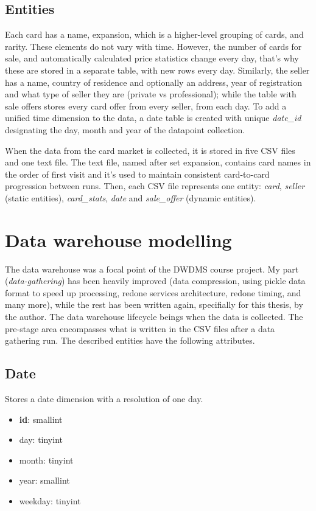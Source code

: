 \subsection{Entities}
Each card has a name, expansion, which is a higher-level grouping of cards, and rarity. These elements do not vary with time. However, the number of cards for sale, and automatically calculated price statistics change every day, that's why these are stored in a separate table, with new rows every day. Similarly, the seller has a name, country of residence and optionally an address, year of registration and what type of seller they are (private vs professional); while the table with sale offers stores every card offer from every seller, from each day. To add a unified time dimension to the data, a date table is created with unique \textit{date\_id} designating the day, month and year of the datapoint collection.

When the data from the card market is collected, it is stored in five CSV files and one text file. The text file, named after set expansion, contains card names in the order of first visit and it's used to maintain consistent card-to-card progression between runs. Then, each CSV file represents one entity: \textit{card}, \textit{seller} (static entities), \textit{card\_stats}, \textit{date} and \textit{sale\_offer} (dynamic entities).

\section{Data warehouse modelling}
The data warehouse was a focal point of the DWDMS course project. My part (\textit{data-gathering}) has been heavily improved (data compression, using pickle data format to speed up processing, redone services architecture, redone timing, and many more), while the rest has been written again, specifially for this thesis, by the author. The data warehouse lifecycle beings when the data is collected. The pre-stage area encompasses what is written in the CSV files after a data gathering run. The described entities have the following attributes.

\subsection{Date}
Stores a date dimension with a resolution of one day.
\begin{itemize}
\setlength\itemsep{0.2em}
\item \textbf{id}: smallint
\item day: tinyint
\item month: tinyint
\item year: smallint
\item weekday: tinyint
\end{itemize}

